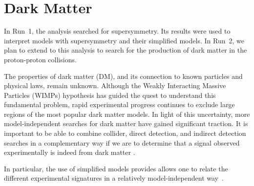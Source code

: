 \section{Dark Matter}
\label{sec:dm}

In Run~1, the \alphat analysis searched for supersymmetry. Its results
were used to interpret models with supersymmetry and their simplified
models. In Run~2, we plan to extend to this analysis to search for the
production of dark matter in the proton-proton collisions.

The properties of dark matter (DM), and its connection to known particles and physical laws, remain unknown. Although the Weakly Interacting Massive Particles (WIMPs) hypothesis has guided the
quest to understand this fundamental problem, rapid experimental progress continues to exclude large regions of the most popular dark matter models. In light of this uncertainty, more model-independent searches for dark matter have gained significant traction. It is important to be able to combine collider, direct detection, and indirect detection searches in a complementary way if we are to
determine that a signal observed experimentally is indeed from dark matter \cite{Bauer:2013ihz}.

In particular, the use of simplified models provides allows one to relate the different experimental
signatures in a relatively model-independent way~\cite{Buchmueller:2014yoa}. 



